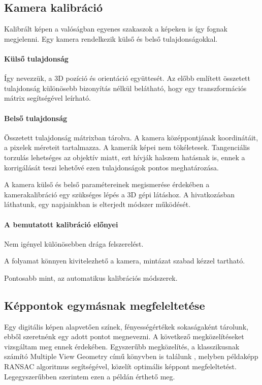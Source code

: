 \documentclass[12pt,a4paper,oneside]{report} %
\begin{document}
\subsection{Kamera kalibráció}
Kalibrált képen a valóságban egyenes szakaszok a képeken is így fognak megjelenni. Egy kamera rendelkezik külső és belső tulajdonságokkal. 
\paragraph{Külső tulajdonság} Így nevezzük, a 3D pozíció és  orientáció együttesét. Az előbb említett összetett  tulajdonság különösebb bizonyítás nélkül belátható, hogy egy transzformációs mátrix segítségével leírható.
\paragraph{Belső tulajdonság} 
Összetett tulajdonság mátrixban tárolva. A kamera középpontjának koordinátáit, a pixelek méreteit tartalmazza.  A kamerák képei nem tökéletesek. Tangenciális torzulás lehetséges az objektív miatt, ezt hívják halszem hatásnak is, ennek a korrigálását teszi lehetővé ezen tulajdonságok pontos meghatározása. 
\par  A kamera külső és belső paramétereinek megismerése érdekében a kamerakalibráció egy szükséges lépés a 3D gépi látáshoz. A \cite{zhang1999flexible} hivatkozásban láthatunk, egy  napjainkban is elterjedt módszer működését.
\paragraph{A bemutatott kalibráció előnyei} 
\begin{compactitem}
	\item Nem igényel különösebben drága felszerelést. 
	\item A folyamat könnyen kivitelezhető a kamera, mintázat szabad kézzel tartható.
	\item Pontosabb mint, az automatikus kalibrációs módszerek.
\end{compactitem}

\subsection{Képpontok egymásnak megfeleltetése}
Egy digitális képen alapvetően színek, fényességértékek sokaságaként tárolunk, ebből szeretnénk egy adott pontot megnevezni. A következő megközelítéseket vizsgáltam meg ennek érdekében. Egyszerűbb megközelítés, a klasszikusnak számító Multiple View Geometry című könyvben is találunk \cite[ó.~140]{hartley2003multiple}, melyben példaképp RANSAC \cite{derpanis2010overview} algoritmus segítségével, közelít optimális képpont megfeleltetést. Legegyszerűbben szerintem ezen a példán érthető meg.
\end{document}
